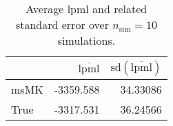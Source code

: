 \begin{table}[H]

\caption{Average lpml and related standard error over $n_{\text{sim}} = 10$ simulations.}
\centering
\begin{tabular}[t]{lrr}
\toprule
  & $\overbar{\text{lpml}}$ & $\text{sd}(\overbar{\text{lpml}})$\\
\midrule
msMK & -3359.588 & 34.33086\\
True & -3317.531 & 36.24566\\
\bottomrule
\end{tabular}
\end{table}